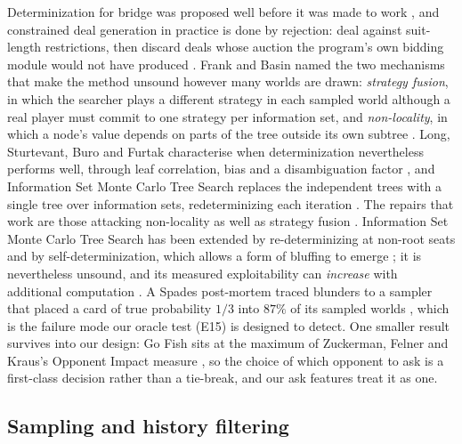 Determinization for bridge was proposed well before it was made to work
\cite{levy}, and constrained deal generation in practice is done by rejection:
deal against suit-length restrictions, then discard deals whose auction the
program's own bidding module would not have produced
\cite{ginsberg-gib,pavlicek}. Frank and Basin named the two mechanisms that
make the method unsound however many worlds are drawn: \emph{strategy fusion},
in which the searcher plays a different strategy in each sampled world
although a real player must commit to one strategy per information set, and
\emph{non-locality}, in which a node's value depends on parts of the tree
outside its own subtree \cite{frank-basin-ai}. Long, Sturtevant, Buro and
Furtak characterise when determinization nevertheless performs well, through
leaf correlation, bias and a disambiguation factor \cite{long-pimc}, and
Information Set Monte Carlo Tree Search replaces the independent trees with a
single tree over information sets, redeterminizing each iteration
\cite{cowling-ismcts}. The repairs that work are those attacking non-locality
as well as strategy fusion \cite{frank-basin-aaai}. Information Set Monte
Carlo Tree Search has been extended by re-determinizing at non-root seats and
by self-determinization, which allows a form of bluffing to emerge
\cite{goodman-ris,cowling-bluffing}; it is nevertheless unsound, and its
measured exploitability can \emph{increase} with additional computation
\cite{lisy-oos}. A Spades post-mortem traced blunders to a sampler that placed
a card of true probability $1/3$ into $87\%$ of its sampled worlds
\cite{whitehouse-spades}, which is the failure mode our oracle test (E15) is
designed to detect. One smaller result survives into our design: Go Fish sits
at the maximum of Zuckerman, Felner and Kraus's Opponent Impact measure
\cite{zuckerman-mpmix}, so the choice of which opponent to ask is a
first-class decision rather than a tie-break, and our ask features treat it as
one.

\subsection{Sampling and history filtering}

